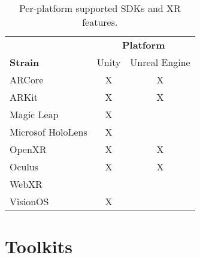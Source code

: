 \documentclass{vgtc}                          %
\begin{document}
\begin{table}[h!]
	\centering

	\begin{tabular}{l c c}
		\toprule
		                  & \multicolumn{2}{c}{\textbf{Platform}}                 \\
		\cmidrule(l){2-3}
		\textbf{Strain}   & Unity                                 & Unreal Engine \\
		\midrule
		ARCore            & X                                     & X             \\
		ARKit             & X                                     & X             \\
		Magic Leap        & X                                     &               \\
		Microsof HoloLens & X                                     &               \\
		OpenXR            & X                                     & X             \\
		Oculus            & X                                     & X             \\
		WebXR             &                                       &               \\
		VisionOS          & X                                     &               \\

		\bottomrule
	\end{tabular}


	\medskip

	\caption{Per-platform supported SDKs and XR features.}
	\label{table:1}
\end{table}

\section{Toolkits}
\end{document}
